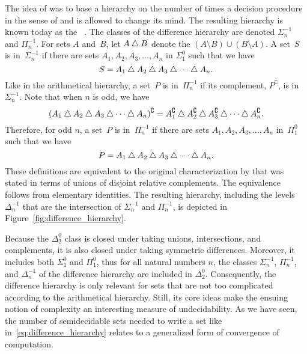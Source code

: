 The idea of \citeauthor{ershov1968hierarchyi} was to base a hierarchy on the number of times a decision procedure in the sense of \citeauthor{putnam1965trial} and \citeauthor{gold1965limiting} is allowed to change its mind.
The resulting hierarchy is known today as the ~\parencite{downey2010algorithmic,soare2016turing}.
The classes of the difference hierarchy are denoted $\Sigma^{-1}_n$ and $\Pi^{-1}_n$.
For sets $A$ and~$B$, let $A \bigtriangleup B$ denote the  $(A \setminus B) \cup (B \setminus A)$.
A set~$S$ is in~$\Sigma^{-1}_n$ if there are sets $A_1, A_2, A_3, \ldots, A_n$ in $\Sigma^0_1$ such that we have
\begin{equation}
\label{eq:difference_hierarchy}
  S = A_1 \bigtriangleup A_2 \bigtriangleup A_3 \bigtriangleup \cdots \bigtriangleup A_n.
\end{equation}
Like in the arithmetical hierarchy, a set~$P$ is in~$\Pi^{-1}_n$ if its complement, $P^\complement$, is in~$\Sigma^{-1}_n$.
Note that when $n$ is odd, we have
\begin{equation*}
  (A_1 \bigtriangleup A_2 \bigtriangleup A_3 \bigtriangleup \cdots \bigtriangleup A_n)^\complement = A_1^\complement \bigtriangleup A_2^\complement \bigtriangleup A_3^\complement \bigtriangleup \cdots \bigtriangleup A_n^\complement.
\end{equation*}
Therefore, for odd $n$, a set~$P$ is in~$\Pi^{-1}_n$ if there are sets $A_1, A_2, A_3, \ldots, A_n$ in~$\Pi^0_1$ such that we have
\begin{equation*}
  P = A_1 \bigtriangleup A_2 \bigtriangleup A_3 \bigtriangleup \cdots \bigtriangleup A_n.
\end{equation*}
These definitions are equivalent to the original characterization by \textcite{ershov1968hierarchyi} that was stated in terms of unions of disjoint relative complements.
The equivalence follows from elementary identities.
The resulting hierarchy, including the levels~$\Delta^{-1}_n$ that are the intersection of $\Sigma^{-1}_n$ and $\Pi^{-1}_n$, is depicted in Figure~\ref{fig:difference_hierarchy}.

Because the $\Delta^0_2$ class is closed under taking unions, intersections, and complements, it is also closed under taking symmetric differences.
Moreover, it includes both $\Sigma^0_1$ and $\Pi^0_1$, thus for all natural numbers $n$, the classes $\Sigma^{-1}_n$, $\Pi^{-1}_n$, and $\Delta^{-1}_n$ of the difference hierarchy are included in $\Delta^0_2$.
Consequently, the difference hierarchy is only relevant for sets that are not too complicated according to the arithmetical hierarchy.
Still, its core ideas make the ensuing notion of complexity an interesting measure of undecidability.
As we have seen, the number of semidecidable sets needed to write a set like in~\eqref{eq:difference_hierarchy} relates to a generalized form of convergence of computation.

